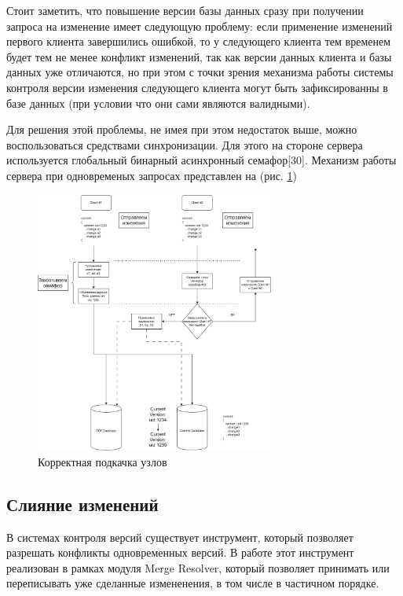 \documentclass[12pt]{article}
\begin{document}
Стоит заметить, что повышение версии базы данных сразу при получении запроса на изменение имеет следующую проблему: если применение изменений первого клиента завершились ошибкой, то у следующего клиента тем временем будет тем не менее конфликт изменений, так как версии данных клиента и базы данных уже отличаются, но при этом с точки зрения механизма работы системы контроля версии изменения следующего клиента могут быть зафиксированны в базе данных (при условии что они сами являются валидными).

Для решения этой проблемы, не имея при этом недостаток выше, можно воспользоваться средствами синхронизации. Для этого на стороне сервера используется глобальный бинарный асинхронный семафор[30]. Механизм работы сервера при одновременых запросах представлен на (рис. \ref{fig:concurrent})

\begin{figure}[!ht]
    \centering
    \includegraphics[width=0.7\textwidth]{_images/concurrent_push_good.png}
    \caption{Корректная подкачка узлов}
    \label{fig:concurrent}
\end{figure}

\pagebreak

\subsection{Слияние изменений}
\qquad В системах контроля версий существует инструмент, который позволяет разрешать конфликты одновременных версий. В работе этот инструмент реализован в рамках модуля Merge Resolver, который позволяет принимать или переписывать уже сделанные измененения, в том числе в частичном порядке.
\end{document}
